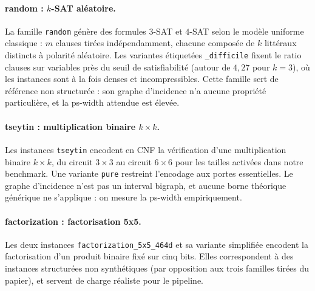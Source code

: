 \documentclass[11pt,a4paper]{report}
\theoremstyle{plain}
\theoremstyle{definition}
\begin{document}
\paragraph{random : $k$-SAT aléatoire.}
La famille \texttt{random} génère des formules $3$-SAT et $4$-SAT
selon le modèle uniforme classique : $m$ clauses tirées
indépendamment, chacune composée de $k$ littéraux distincts à
polarité aléatoire. Les variantes étiquetées \texttt{\_difficile}
fixent le ratio clauses sur variables près du seuil de
satisfiabilité (autour de $4{,}27$ pour $k = 3$), où les instances
sont à la fois denses et incompressibles. Cette famille sert de
référence non structurée : son graphe d'incidence n'a aucune
propriété particulière, et la ps-width attendue est élevée.

\paragraph{tseytin : multiplication binaire $k \times k$.}
Les instances \texttt{tseytin} encodent en CNF la vérification d'une
multiplication binaire $k \times k$, du circuit $3 \times 3$ au
circuit $6 \times 6$ pour les tailles activées dans notre benchmark. Une
variante \texttt{pure} restreint l'encodage aux portes essentielles.
Le graphe d'incidence n'est pas un interval bigraph, et aucune borne
théorique générique ne s'applique : on mesure la ps-width
empiriquement.

\paragraph{factorization : factorisation 5x5.}
Les deux instances \texttt{factorization\_5x5\_464d} et sa variante
simplifiée encodent la factorisation d'un produit binaire fixé sur
cinq bits. Elles correspondent à des instances structurées
non synthétiques (par opposition aux trois familles tirées du
papier), et servent de charge réaliste pour le pipeline.
\end{document}
